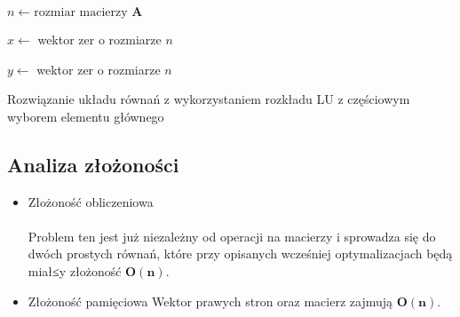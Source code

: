 \documentclass{article}
\begin{document}
\begin{algorithm}[H]
\SetAlgoLined
\setcounter{AlgoLine}{0} %

$n \gets \text{rozmiar macierzy } \mathbf{A}$\;

$x \gets$ wektor zer o rozmiarze $n$\;

$y \gets$ wektor zer o rozmiarze $n$\;



\;
\caption{Rozwiązanie układu równań  z wykorzystaniem rozkładu LU z częściowym wyborem elementu głównego}
\end{algorithm}

\subsection{Analiza złożoności}
\begin{itemize}
    \item Złożoność obliczeniowa 
    \\ \\
    Problem ten jest już niezależny od operacji na macierzy i sprowadza się do dwóch prostych równań, które przy opisanych wcześniej optymalizacjach będą miał≤y złożoność $\mathbf{O(n)}$.
    \item Złożoność pamięciowa
    Wektor prawych stron oraz macierz zajmują $\mathbf{O(n)}$.
\end{itemize}
\end{document}
